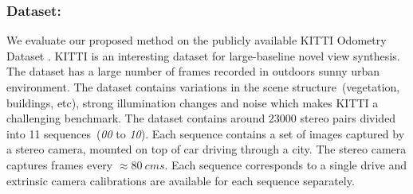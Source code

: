 \documentclass[runningheads]{llncs}
\begin{document}
\subsubsection*{Dataset:} We evaluate our proposed method on the publicly available KITTI Odometry Dataset \cite{geiger2012we}. KITTI is an interesting dataset for large-baseline novel view synthesis. The dataset has a large number of frames recorded in outdoors sunny urban environment. The dataset contains variations in the scene structure~(vegetation, buildings, etc), strong illumination changes and noise which makes KITTI a challenging benchmark. The dataset contains around $23000$ stereo pairs divided into 11 sequences~(\textit{00} to \textit{10}). Each sequence contains a set of images captured by a stereo camera, mounted on top of car driving through a city. The stereo camera captures frames every $\approx 80~cms$. Each sequence corresponds to a single drive and extrinsic camera calibrations are available for each sequence separately.
\end{document}
